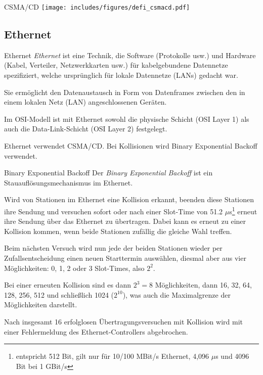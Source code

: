 \begin{diag}{CSMA/CD}
    \centering
    \texttt{[image: includes/figures/defi\_csmacd.pdf]}
\end{diag}

\subsection{Ethernet}

\begin{defi}{Ethernet}
    \emph{Ethernet} ist eine Technik, die Software (Protokolle usw.) und Hardware (Kabel, Verteiler, Netzwerkkarten usw.) für kabelgebundene Datennetze spezifiziert, welche ursprünglich für lokale Datennetze (LANs) gedacht war.

    Sie ermöglicht den Datenaustausch in Form von Datenframes zwischen den in einem lokalen Netz (LAN) angeschlossenen Geräten.

    Im OSI-Modell ist mit Ethernet sowohl die physische Schicht (OSI Layer 1) als auch die Data-Link-Schicht (OSI Layer 2) festgelegt.

    Ethernet verwendet CSMA/CD.
    Bei Kollisionen wird Binary Exponential Backoff verwendet.
\end{defi}

\begin{defi}{Binary Exponential Backoff}
    Der \emph{Binary Exponential Backoff} ist ein Stauauflösungsmechanismus im Ethernet.

    Wird von Stationen im Ethernet eine Kollision erkannt, beenden diese Stationen ihre Sendung und versuchen sofort oder nach einer Slot-Time von 51.2 $\mu$s\footnote{entspricht 512 Bit, gilt nur für 10/100 MBit/s Ethernet, 4,096 $\mu$s und 4096 Bit bei 1 GBit/s} erneut ihre Sendung über das Ethernet zu übertragen.
    Dabei kann es erneut zu einer Kollision kommen, wenn beide Stationen zufällig die gleiche Wahl treffen.

    Beim nächsten Versuch wird nun jede der beiden Stationen wieder per Zufallsentscheidung einen neuen Starttermin auswählen, diesmal aber aus vier Möglichkeiten: 0, 1, 2 oder 3 Slot-Times, also $2^2$.

    Bei einer erneuten Kollision sind es dann $2^3 = 8$ Möglichkeiten, dann 16, 32, 64, 128, 256, 512 und schließlich 1024 ($2^{10}$), was auch die Maximalgrenze der Möglichkeiten darstellt.

    Nach insgesamt 16 erfolglosen Übertragungsversuchen mit Kollision wird mit einer Fehlermeldung des Ethernet-Controllers abgebrochen.
\end{defi}

